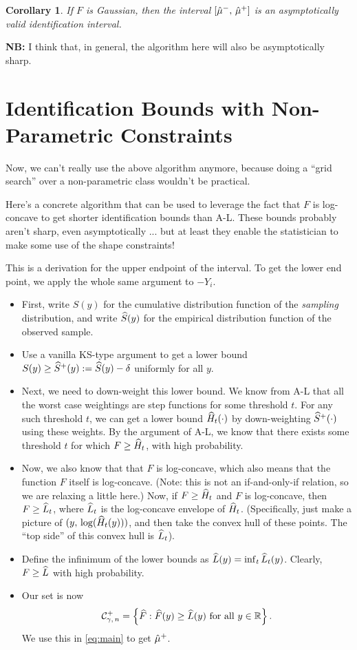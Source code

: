 \documentclass{article}
\theoremstyle{plain}
\newtheorem{coro}[prop]{Corollary}
\theoremstyle{definition}
\theoremstyle{remark}
\begin{document}
\begin{coro}
If $F$ is Gaussian, then the interval $[\hat{\mu}^-, \, \hat{\mu}^+]$ is an asymptotically valid identification interval.
\end{coro}

{\bf NB:} I think that, in general, the algorithm here will also be asymptotically sharp.

\section{Identification Bounds with Non-Parametric Constraints}

Now, we can't really use the above algorithm anymore, because doing a ``grid search''
over a non-parametric class wouldn't be practical.

Here's a concrete algorithm that can be used to leverage the fact that $F$ is log-concave
to get shorter identification bounds than A-L. These bounds probably aren't 
sharp, even asymptotically ... but at least they enable the statistician to make
some use of the shape constraints!

This is a derivation for the upper endpoint of the interval.
To get the lower end point, we apply the whole same argument to $-Y_i$.
\begin{itemize}
\item First, write $S(y)$ for the cumulative distribution function of the
\emph{sampling} distribution, and write $\widehat{S}(y)$ for the empirical distribution
function of the observed sample.
\item Use a vanilla KS-type argument to get a lower bound $S(y) \geq \widehat{S}^+(y) := \widehat{S}(y) - \delta$
uniformly for all $y$.
\item Next, we need to down-weight this lower bound. We know from A-L that all the
worst case weightings are step functions for some threshold $t$. For any such threshold
$t$, we can get a lower bound $\widehat{H}_t(\cdot)$ by down-weighting $\widehat{S}^+(\cdot)$ using
these weights. By the argument of A-L, we know that there exists some threshold $t$
for which $F \geq \widehat{H}_t$, with high probability.
\item Now, we also know that that $F$ is log-concave, which also means that the function
$F$ itself is log-concave. (Note: this is not an if-and-only-if relation, so we are relaxing
a little here.) Now, if $F \geq \widehat{H}_t$ and $F$ is log-concave, then $F \geq \widehat{L}_t$,
where $\widehat{L}_t$ is the log-concave envelope of $\widehat{H}_t$. (Specifically, just make a picture
of $(y, \, \log(\widehat{H}_t(y)))$, and then take the convex hull of these points. The ``top side''
of this convex hull is $\widehat{L}_t$).
\item Define the infinimum of the lower bounds as $\widehat{L}(y) = \inf_t \widehat{L}_t(y)$.
Clearly, $F \geq \widehat{L}$ with high probability. 
\item Our set is now
$$ \mathcal{C}^+_{\gamma, \, n} = \left\{\widehat{F} : \widehat{F}(y) \geq \widehat{L}(y) \text{ for all } y \in \mathbb{R}\right\}. $$
We use this in \eqref{eq:main} to get $\hat{\mu}^+$.
\end{itemize}
\end{document}
